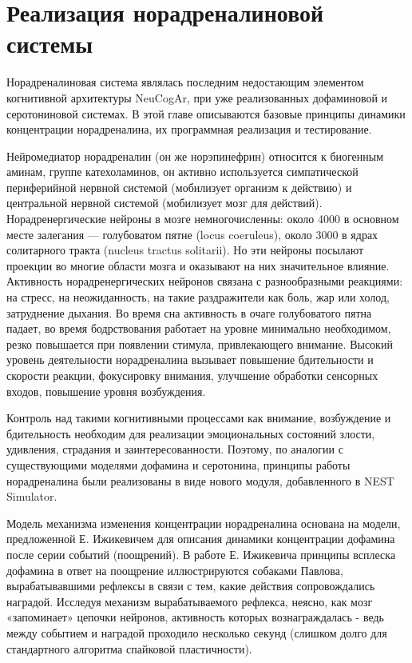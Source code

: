 \chapter{Реализация норадреналиновой системы}
\label{chap:nora}
Норадреналиновая система являлась последним недостающим элементом когнитивной архитектуры NeuCogAr, при уже реализованных дофаминовой и серотониновой системах. В этой главе описываются базовые принципы динамики концентрации норадреналина, их программная реализация и тестирование.


Нейромедиатор норадреналин (он же норэпинефрин) относится к биогенным аминам, группе катехоламинов, он активно используется симпатической периферийной нервной системой (мобилизует организм к действию) и центральной нервной системой (мобилизует мозг для действий). Норадренергические нейроны в мозге немногочисленны: около 4000 в основном месте залегания — голубоватом пятне (locus coeruleus), около 3000 в ядрах солитарного тракта (nucleus tractus solitarii). Но эти нейроны посылают проекции во многие области мозга и оказывают на них значительное влияние. Активность норадренергических нейронов связана с разнообразными реакциями: на стресс, на неожиданность, на такие раздражители как боль, жар или холод, затруднение дыхания. Во время сна активность в очаге голубоватого пятна падает, во время бодрствования работает на уровне минимально необходимом, резко повышается при появлении стимула, привлекающего внимание. Высокий уровень деятельности норадреналина вызывает повышение бдительности и скорости реакции, фокусировку внимания, улучшение обработки сенсорных входов, повышение уровня возбуждения.


Контроль над такими когнитивными процессами как внимание, возбуждение и бдительность необходим для реализации эмоциональных состояний злости, удивления, страдания и заинтересованности. Поэтому, по аналогии с существующими моделями дофамина и серотонина, принципы работы норадреналина были реализованы в виде нового модуля, добавленного в NEST Simulator.


Модель механизма изменения концентрации норадреналина основана на модели, предложенной Е. Ижикевичем для описания динамики концентрации дофамина после серии событий (поощрений). В работе Е. Ижикевича принципы всплеска дофамина в ответ на поощрение иллюстрируются собаками Павлова, вырабатывавшими рефлексы в связи с тем, какие действия сопровождались наградой. Исследуя механизм вырабатываемого рефлекса, неясно, как мозг «запоминает» цепочки нейронов, активность которых вознаграждалась - ведь между событием и наградой проходило несколько секунд (слишком долго для стандартного алгоритма спайковой пластичности).


